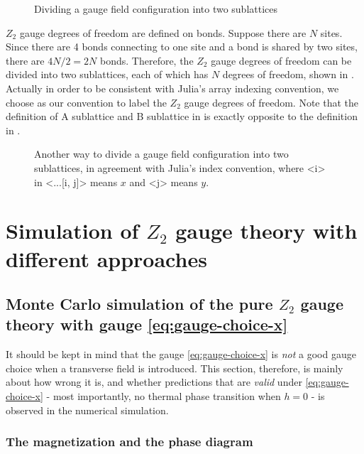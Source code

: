 \documentclass[hyperref, a4paper]{article}
\newcommand*{\Ztwo}{\texorpdfstring{$\mathbb{Z}_2$ }{Z2 }}
\def\texttt#1{<#1>}%
\def\mathbb#1{#1}%
\begin{document}
\begin{figure}
    \centering
    
    \caption{Dividing a gauge field configuration into two sublattices}
    \label{fig:z2-dividing}
\end{figure}

\Ztwo gauge degrees of freedom are defined on bonds. 
Suppose there are $N$ sites. Since there are 4 bonds connecting to one site and a bond is shared by two sites,
there are $4 N / 2 = 2 N$ bonds.
Therefore, the \Ztwo gauge degrees of freedom can be divided into two sublattices, each of which has $N$ degrees of freedom, shown in .
Actually in order to be consistent with Julia's array indexing convention, we choose  as our convention to label the \Ztwo gauge degrees of freedom.
Note that the definition of A sublattice and B sublattice in  is exactly opposite to the definition in .

\begin{figure}
    \centering
    
    \caption{Another way to divide a gauge field configuration into two sublattices, in agreement with Julia's index convention, where \texttt{i} in \texttt{...[i, j]} means $x$ and \texttt{j} means $y$.}
    \label{fig:z2-dividing-real}
\end{figure}


\section{Simulation of \Ztwo gauge theory with different approaches}

\subsection{Monte Carlo simulation of the pure \Ztwo gauge theory with gauge \eqref{eq:gauge-choice-x}}

It should be kept in mind that the gauge \eqref{eq:gauge-choice-x} is \emph{not} a good gauge choice when a transverse field is introduced.
This section, therefore, is mainly about how wrong it is, and whether predictions that are \emph{valid} under \eqref{eq:gauge-choice-x} - most importantly, no thermal phase transition when $h=0$ - is observed in the numerical simulation.

\subsubsection{The magnetization and the phase diagram}
\end{document}
